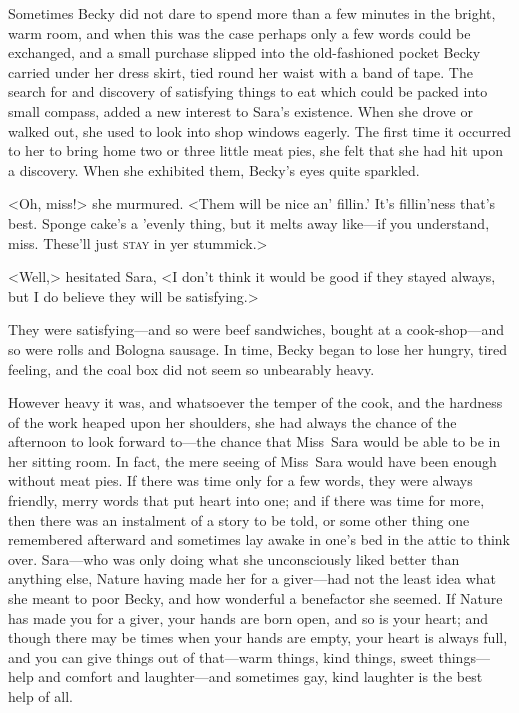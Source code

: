 Sometimes Becky did not dare to spend more than a few minutes in the bright, warm room, and when this was the case perhaps only a few words could be exchanged, and a small purchase slipped into the old-fashioned pocket Becky carried under her dress skirt, tied round her waist with a band of tape. The search for and discovery of satisfying things to eat which could be packed into small compass, added a new interest to Sara's existence. When she drove or walked out, she used to look into shop windows eagerly. The first time it occurred to her to bring home two or three little meat pies, she felt that she had hit upon a discovery. When she exhibited them, Becky's eyes quite sparkled.

<Oh, miss!> she murmured. <Them will be nice an' fillin.' It's fillin'ness that's best. Sponge cake's a 'evenly thing, but it melts away like—if you understand, miss. These'll just \textsc{stay} in yer stummick.>

<Well,> hesitated Sara, <I don't think it would be good if they stayed always, but I do believe they will be satisfying.>

They were satisfying—and so were beef sandwiches, bought at a cook-shop—and so were rolls and Bologna sausage. In time, Becky began to lose her hungry, tired feeling, and the coal box did not seem so unbearably heavy.

However heavy it was, and whatsoever the temper of the cook, and the hardness of the work heaped upon her shoulders, she had always the chance of the afternoon to look forward to—the chance that Miss~Sara would be able to be in her sitting room. In fact, the mere seeing of Miss~Sara would have been enough without meat pies. If there was time only for a few words, they were always friendly, merry words that put heart into one; and if there was time for more, then there was an instalment of a story to be told, or some other thing one remembered afterward and sometimes lay awake in one's bed in the attic to think over. Sara—who was only doing what she unconsciously liked better than anything else, Nature having made her for a giver—had not the least idea what she meant to poor Becky, and how wonderful a benefactor she seemed. If Nature has made you for a giver, your hands are born open, and so is your heart; and though there may be times when your hands are empty, your heart is always full, and you can give things out of that—warm things, kind things, sweet things—help and comfort and laughter—and sometimes gay, kind laughter is the best help of all.

